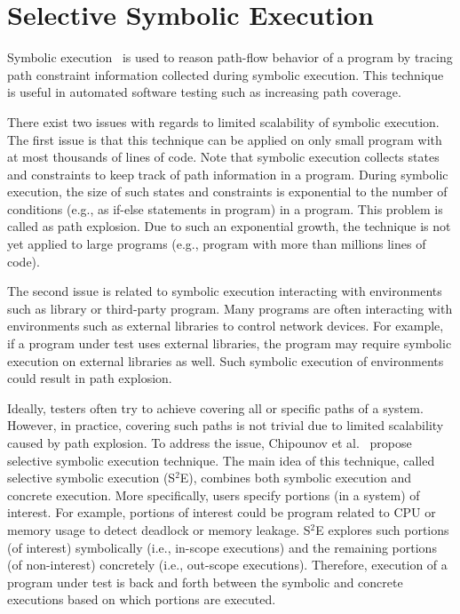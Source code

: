 \section{Selective Symbolic Execution}

Symbolic execution~\cite{symbolic} is used to reason path-flow behavior of a program by tracing path constraint information collected during symbolic execution. This technique is useful in automated software testing such as increasing path coverage.

There exist two issues with regards to limited scalability of symbolic execution. The first issue is that this technique can be applied on only small program with at most thousands of lines of code. Note that symbolic execution collects states and constraints to keep track of path information in a program. During symbolic execution, the size of such states and constraints is exponential to the number of conditions (e.g., as if-else statements in program) in a program. This problem is called as path explosion. Due to such an exponential growth, the technique is not yet applied to large programs (e.g., program with more than millions lines of code).

The second issue is related to symbolic execution interacting with environments such as library or third-party program. Many programs are often interacting with environments such as external libraries to control network devices. For example, if a program under test uses external libraries, the program may require symbolic execution on external libraries as well. Such symbolic execution of environments could result in path explosion.

Ideally, testers often try to achieve covering all or specific paths of a system. However, in practice, covering such paths is not trivial due to limited scalability caused by path explosion. To address the issue, Chipounov et al.~\cite{selective} propose selective symbolic execution technique. The main idea of this technique, called selective symbolic execution (S$^2$E), combines both symbolic execution and concrete execution. More specifically, users specify portions (in a system) of interest. For example, portions of interest could be program related to CPU or memory usage to detect deadlock or memory leakage. S$^2$E explores such portions (of interest) symbolically (i.e., in-scope executions) and the remaining portions (of non-interest) concretely (i.e., out-scope executions). Therefore, execution of a program under test is back and forth between the symbolic and concrete executions based on which portions are executed.

